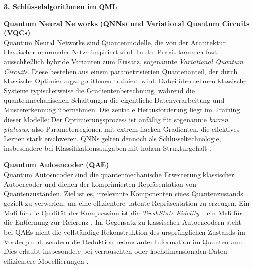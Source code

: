 \noindent\textbf{3. Schlüsselalgorithmen im QML}  

\vspace{0.3cm}
\noindent
\textbf{Quantum Neural Networks (QNNs) und Variational Quantum Circuits (VQCs)}\\
Quantum Neural Networks sind Quantenmodelle, die von der Architektur klassischer neuronaler Netze inspiriert sind. In der Praxis kommen fast ausschließlich hybride Varianten zum Einsatz, sogenannte \textit{Variational Quantum Circuits}. Diese bestehen aus einem parametrisierten Quantenanteil, der durch klassische Optimierungsalgorithmen trainiert wird. Dabei übernehmen klassische Systeme typischerweise die Gradientenberechnung, während die quantenmechanischen Schaltungen die eigentliche Datenverarbeitung und Mustererkennung übernehmen. Die zentrale Herausforderung liegt im Training dieser Modelle: Der Optimierungsprozess ist anfällig für sogenannte \textit{barren plateaus}, also Parameterregionen mit extrem flachen Gradienten, die effektives Lernen stark erschweren. QNNs gelten dennoch als Schlüsseltechnologie, insbesondere bei Klassifikationsaufgaben mit hohem Strukturgehalt \cite{abbas2021}.  

\vspace{0.3cm}
\noindent
\textbf{Quantum Autoencoder (QAE)}\\
Quantum Autoencoder sind die quantenmechanische Erweiterung klassischer Autoencoder und dienen der komprimierten Repräsentation von Quantenzuständen. Ziel ist es, irrelevante Komponenten eines Quantenzustands gezielt zu verwerfen, um eine effizientere, latente Repräsentation zu erzeugen. Ein Maß für die Qualität der Kompression ist die \textit{TrashState-Fidelity} – ein Maß für die Entfernung zur Referenz \cite{ngairangbam2022}. Im Gegensatz zu klassischen Autoencodern steht bei QAEs nicht die vollständige Rekonstruktion des ursprünglichen Zustands im Vordergrund, sondern die Reduktion redundanter Information im Quantenraum. Dies erlaubt insbesondere bei verrauschten oder hochdimensionalen Daten effizientere Modellierungen \cite{schuld2018}.  

